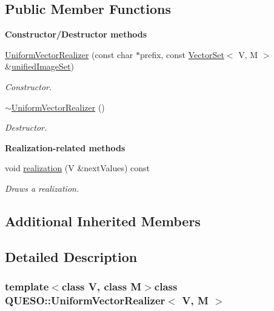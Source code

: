 \subsection*{Public Member Functions}
\begin{Indent}{\bf Constructor/\-Destructor methods}\par
\begin{DoxyCompactItemize}
\item 
\hyperlink{class_q_u_e_s_o_1_1_uniform_vector_realizer_a68012df178de00ac40163033fa42c4b3}{Uniform\-Vector\-Realizer} (const char $\ast$prefix, const \hyperlink{class_q_u_e_s_o_1_1_vector_set}{Vector\-Set}$<$ V, M $>$ \&\hyperlink{class_q_u_e_s_o_1_1_base_vector_realizer_ad958991bab8d6369e8a0d66b22a237d4}{unified\-Image\-Set})
\begin{DoxyCompactList}\small\item\em Constructor. \end{DoxyCompactList}\item 
\hyperlink{class_q_u_e_s_o_1_1_uniform_vector_realizer_a39faaea0c942308fedee9cc672ad0a75}{$\sim$\-Uniform\-Vector\-Realizer} ()
\begin{DoxyCompactList}\small\item\em Destructor. \end{DoxyCompactList}\end{DoxyCompactItemize}
\end{Indent}
\begin{Indent}{\bf Realization-\/related methods}\par
\begin{DoxyCompactItemize}
\item 
void \hyperlink{class_q_u_e_s_o_1_1_uniform_vector_realizer_a59c9c5c848823a4c6b0992adc4f772e2}{realization} (V \&next\-Values) const 
\begin{DoxyCompactList}\small\item\em Draws a realization. \end{DoxyCompactList}\end{DoxyCompactItemize}
\end{Indent}
\subsection*{Additional Inherited Members}


\subsection{Detailed Description}
\subsubsection*{template$<$class V, class M$>$class Q\-U\-E\-S\-O\-::\-Uniform\-Vector\-Realizer$<$ V, M $>$}

